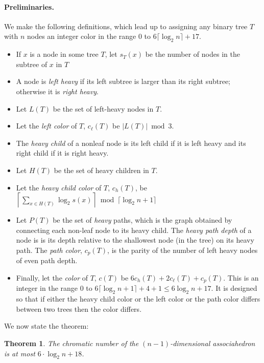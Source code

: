 \documentclass[10pt,a4paper]{article}
\newtheorem{theorem}{Theorem}
\begin{document}
\paragraph{Preliminaries.} We make the following definitions, which lead up to assigning any binary tree $T$ with $n$ nodes an integer color in the range 0 to $6 \lceil \log_2 n \rceil +17$.

\begin{itemize}
    \item If $x$ is a node in some tree $T$, let $s_T(x)$ be the number of nodes in the subtree of $x$ in $T$
    \item A node is \emph{left heavy} if its left subtree is larger than its right subtree; otherwise it is \emph{right heavy}.
    \item Let $L(T)$ be the set of left-heavy nodes in $T$.
    \item Let the \emph{left color} of $T$, $c_\ell(T)$ be $|L(T)| \bmod 3$.
    \item The \emph{heavy child} of a nonleaf node is its left child if it is left heavy and its right child if it is right heavy.
    \item Let $H(T)$ be the set of heavy children in $T$.
    \item Let the \emph{heavy child color} of $T$, $c_h(T)$, be $\left\lceil  \sum_{x \in H(T)} \log_2 s(x) \right\rceil \bmod \lceil \log_2n+1 \rceil$
    \item Let $P(T)$ be the set of \emph{heavy} paths, which is the graph obtained by connecting each non-leaf node to its heavy child. The \emph{heavy path depth} of a node is is its depth relative to the shallowest node (in the tree) on its heavy path. The \emph{path color}, $c_p(T)$, is the parity of the number of left heavy nodes of even path depth. 
    \item Finally, let the \emph{color} of $T$, $c(T)$ be $6c_h(T)+2c_\ell(T)+c_p(T)$. This is an integer in the range 0 to $6 \lceil \log_2 n + 1 \rceil +4+1 \leq 6 \log_2n+17$. It is designed so that if either the heavy child color or the left color or the path color differs between two trees then the color differs.
\end{itemize}

We now state the theorem:


\begin{theorem}
The chromatic number of the $(n-1)$-dimensional associahedron is at most $6\cdot \log_2 n + 18$.
\end{theorem}
\end{document}

